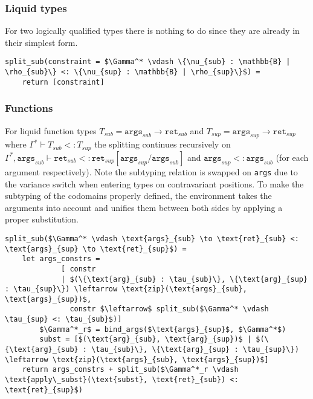 \subsubsection{Liquid types}

For two logically qualified types there is nothing to do since they are already
in their simplest form.

\begin{lstlisting}[language=pseudocode]
split_sub(constraint = $\Gamma^* \vdash \{\nu_{sub} : \mathbb{B} | \rho_{sub}\} <: \{\nu_{sup} : \mathbb{B} | \rho_{sup}\}$) =
    return [constraint]
\end{lstlisting}

\subsubsection{Functions}

For liquid function types $T_{sub} = \texttt{args}_{sub} \to \texttt{ret}_{sub}$
and $T_{sup} = \texttt{args}_{sup} \to \texttt{ret}_{sup}$ where $\Gamma^* \vdash
T_{sub} <: T_{sup}$ the splitting continues recursively on $\Gamma^*,
\texttt{args}_{sub} \vdash \texttt{ret}_{sub} <:
\texttt{ret}_{sup}[\texttt{args}_{sup} / \texttt{args}_{sub}]$ and
$\texttt{args}_{sup} <: \texttt{args}_{sub}$ (for each argument respectively).
Note the subtyping relation is swapped on \texttt{args} due to the variance
switch when entering types on contravariant positions. To make the subtyping of
the codomains properly defined, the environment takes the arguments into account
and unifies them between both sides by applying a proper substitution.

\begin{lstlisting}[language=pseudocode]
split_sub($\Gamma^* \vdash \text{args}_{sub} \to \text{ret}_{sub} <: \text{args}_{sup} \to \text{ret}_{sup}$) =
    let args_constrs =
             [ constr
             | $(\{\text{arg}_{sub} : \tau_{sub}\}, \{\text{arg}_{sup} : \tau_{sup}\}) \leftarrow \text{zip}(\text{args}_{sub}, \text{args}_{sup})$,
               constr $\leftarrow$ split_sub($\Gamma^* \vdash \tau_{sup} <: \tau_{sub}$)]
        $\Gamma^*_r$ = bind_args($\text{args}_{sup}$, $\Gamma^*$)
        subst = [$(\text{arg}_{sub}, \text{arg}_{sup})$ | $(\{\text{arg}_{sub} : \tau_{sub}\}, \{\text{arg}_{sup} : \tau_{sup}\}) \leftarrow \text{zip}(\text{args}_{sub}, \text{args}_{sup})$]
    return args_constrs + split_sub($\Gamma^*_r \vdash \text{apply\_subst}(\text{subst}, \text{ret}_{sub}) <: \text{ret}_{sup}$)

\end{lstlisting}

